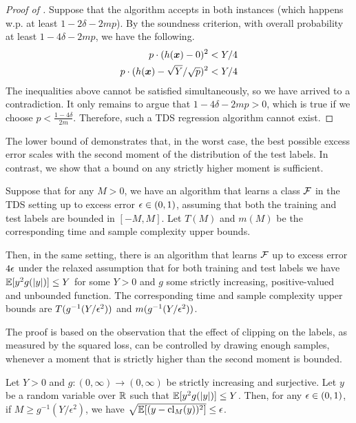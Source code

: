 \begin{proof}[Proof of ]
    Suppose that the algorithm accepts in both instances (which happens w.p. at least $1-2\delta-2mp$). By the soundness criterion, with overall probability at least $1-4\delta-2mp$, we have the following.
    \begin{align*}
        p\cdot (h({\bm{x}}) - 0)^2 &< Y/4 \\
        p\cdot (h({\bm{x}}) - \sqrt{Y}/\sqrt{p})^2 &< Y/4
    \end{align*}
    The inequalities above cannot be satisfied simultaneously, so we have arrived to a contradiction. It only remains to argue that $1-4\delta-2mp >0$, which is true if we choose $p<\frac{1-4\delta}{2m}$. Therefore, such a TDS regression algorithm cannot exist.
\end{proof}

The lower bound of  demonstrates that, in the worst case, the best possible excess error scales with the second moment of the distribution of the test labels. In contrast, we show that a bound on any strictly higher moment is sufficient.


\begin{corollary}\label{corollary:label-moment-bound-assumption-suffices}
    Suppose that for any $M>0$, we have an algorithm that learns a class ${\mathcal{F}}$ in the TDS setting up to excess error ${\epsilon}\in(0,1)$, assuming that both the training and test labels are bounded in $[-M,M]$. Let $T(M)$ and $m(M)$ be the corresponding time and sample complexity upper bounds. 
    
    Then, in the same setting, there is an algorithm that learns ${\mathcal{F}}$ up to excess error $4{\epsilon}$ under the relaxed assumption that for both training and test labels we have $\mathbb{E}[y^2g(|y|)]\le Y$ for some $Y>0$ and $g$ some strictly increasing, positive-valued and unbounded function. The corresponding time and sample complexity upper bounds are $T(g^{-1}(Y/{\epsilon}^2))$ and $m(g^{-1}(Y/{\epsilon}^2))$.
\end{corollary}

The proof is based on the observation that the effect of clipping on the labels, as measured by the squared loss, can be controlled by drawing enough samples, whenever a moment that is strictly higher than the second moment is bounded.


\begin{lemma}\label{lemma:label-moment-bound-suffices}
    Let $Y>0$ and $g:(0,\infty) \to (0,\infty)$ be strictly increasing and surjective. Let $y$ be a random variable over $\mathbb{R}$ such that $\mathbb{E}[y^{2}g(|y|)] \le Y$. Then, for any ${\epsilon}\in(0,1)$, if $M \ge g^{-1}(Y/\epsilon^2)$, we have $\sqrt{\mathbb{E}[(y-\mathrm{cl}_M(y))^2]} \le \epsilon$.
\end{lemma}

